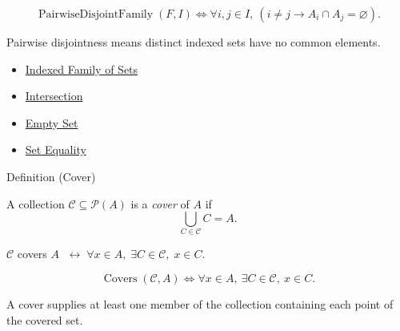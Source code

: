 \begin{remark*}
\[
  \operatorname{PairwiseDisjointFamily}(F,I)
  \iff
  \forall i,j\in I,\ (i\neq j\to A_i\cap A_j=\varnothing).
\]
\end{remark*}

\begin{remark*}[Interpretation]
Pairwise disjointness means distinct indexed sets have no common elements.
\end{remark*}

\begin{dependencies}
\begin{itemize}
  \item \hyperref[def:indexed-family]{Indexed Family of Sets}
  \item \hyperref[def:intersection]{Intersection}
  \item \hyperref[def:empty-set]{Empty Set}
  \item \hyperref[def:set-equality]{Set Equality}
\end{itemize}
\end{dependencies}

\begin{definitionbox}{Definition (Cover)}
\begin{definition}[Cover]\label{def:set-cover}
A collection $\mathcal{C} \subseteq \mathcal{P}(A)$ is a \emph{cover} of $A$ if
\[
\bigcup_{C \in \mathcal{C}} C = A.
\]
\end{definition}
\end{definitionbox}

\begin{remark*}
$\mathcal{C}$ covers $A$ $\;\leftrightarrow\; \forall x \in A,\; \exists C \in \mathcal{C},\; x \in C$.
\end{remark*}

\begin{remark*}
\[
  \operatorname{Covers}(\mathcal{C},A)
  \iff
  \forall x\in A,\ \exists C\in\mathcal{C},\ x\in C.
\]
\end{remark*}

\begin{remark*}[Interpretation]
A cover supplies at least one member of the collection containing each point of
the covered set.
\end{remark*}


